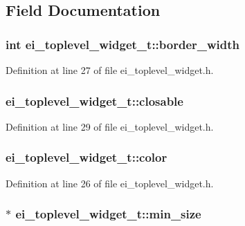 \subsection{Field Documentation}
\hypertarget{structei__toplevel__widget__t_a6f8b26f1614ee8f1e552e6792d49e90b}{
\subsubsection[{border\-\_\-width}]{\setlength{\rightskip}{0pt plus 5cm}int ei\-\_\-toplevel\-\_\-widget\-\_\-t\-::border\-\_\-width}}\label{structei__toplevel__widget__t_a6f8b26f1614ee8f1e552e6792d49e90b}


Definition at line 27 of file ei\-\_\-toplevel\-\_\-widget.\-h.

\hypertarget{structei__toplevel__widget__t_a1710c07d0ecdc5129c984cc98ec08507}{
\subsubsection[{closable}]{ ei\-\_\-toplevel\-\_\-widget\-\_\-t\-::closable}}\label{structei__toplevel__widget__t_a1710c07d0ecdc5129c984cc98ec08507}


Definition at line 29 of file ei\-\_\-toplevel\-\_\-widget.\-h.

\hypertarget{structei__toplevel__widget__t_a2d580b44e8d350f1b6d5af8d84802bc0}{
\subsubsection[{color}]{ ei\-\_\-toplevel\-\_\-widget\-\_\-t\-::color}}\label{structei__toplevel__widget__t_a2d580b44e8d350f1b6d5af8d84802bc0}


Definition at line 26 of file ei\-\_\-toplevel\-\_\-widget.\-h.

\hypertarget{structei__toplevel__widget__t_a6907cc11a098f8aeb3df806535de165b}{
\subsubsection[{min\-\_\-size}]{$\ast$ ei\-\_\-toplevel\-\_\-widget\-\_\-t\-::min\-\_\-size}}\label{structei__toplevel__widget__t_a6907cc11a098f8aeb3df806535de165b}


